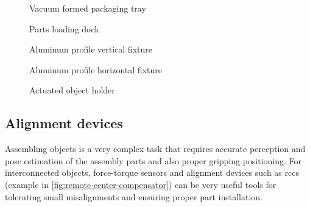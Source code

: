 \begin{figure}[H]
	\begin{floatrow}[2]
		{\caption[Vacuum formed packaging tray]{Vacuum formed packaging tray\protect\footnotemark}\label{fig:vacuum-formed-packaging-trays}}

		{\caption[Parts loading dock]{Parts loading dock\protect\footnotemark}\label{fig:parts-loading-fixture}}
	\end{floatrow}
\end{figure}

\begin{figure}[H]
	\begin{floatrow}[3]
		{\caption[Aluminum profile vertical fixture]{Aluminum profile vertical fixture\protect\footnotemark[\value{footnote}]}\label{fig:profile-vertical-fixture}}

		{\caption[Aluminum profile horizontal fixture]{Aluminum profile horizontal fixture\protect\footnotemark[\value{footnote}]}\label{fig:profile-horizontal-fixture}}

		{\caption[Actuated object holder]{Actuated object holder\protect\footnotemark}\label{fig:part-fixture-actuated}}
	\end{floatrow}
\end{figure}



\subsection{Alignment devices}

Assembling objects is a very complex task that requires accurate perception and pose estimation of the assembly parts and also proper gripping positioning. For interconnected objects, force-torque sensors and alignment devices such as \glspl{rcc} (example in \cref{fig:remote-center-compensator}) can be very useful tools for tolerating small misalignments and ensuring proper part installation.

